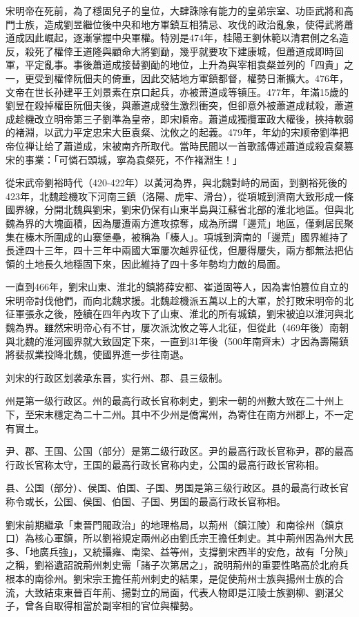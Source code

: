 宋明帝在死前，為了穩固兒子的皇位，大肆誅除有能力的皇弟宗室、功臣武將和高門士族，造成劉昱繼位後中央和地方軍鎮互相猜忌、攻伐的政治亂象，使得武將蕭道成因此崛起，逐漸掌握中央軍權。特別是474年，桂陽王劉休範以清君側之名造反，殺死了權倖王道隆與顧命大將劉勔，幾乎就要攻下建康城，但蕭道成即時回軍，平定亂事。事後蕭道成接替劉勔的地位，上升為與宰相袁粲並列的「四貴」之一，更受到權倖阮佃夫的倚重，因此交結地方軍鎮都督，權勢日漸擴大。476年，文帝在世长孙建平王刘景素在京口起兵，亦被萧道成等镇压。477年，年滿15歲的劉昱在殺掉權臣阮佃夫後，與蕭道成發生激烈衝突，但卻意外被蕭道成弒殺，蕭道成趁機改立明帝第三子劉準為皇帝，即宋順帝。蕭道成獨攬軍政大權後，挾持軟弱的褚淵，以武力平定忠宋大臣袁粲、沈攸之的起義。479年，年幼的宋顺帝劉準把帝位禅让给了蕭道成，宋被南齐所取代。當時民間以一首歌謠傳述蕭道成殺袁粲篡宋的事業：「可憐石頭城，寧為袁粲死，不作褚淵生！」

從宋武帝劉裕時代（420-422年）以黃河為界，與北魏對峙的局面，到劉裕死後的423年，北魏趁機攻下河南三鎮（洛陽、虎牢、滑台），從項城到濟南大致形成一條國界線，分開北魏與劉宋，劉宋仍保有山東半島與江蘇省北部的淮北地區。但與北魏為界的大塊面積，因為屢遭兩方進攻掠奪，成為所謂「邊荒」地區，僅剩居民聚集在榛木所圍成的山寨堡壘，被稱為「榛人」。項城到濟南的「邊荒」國界維持了長達四十三年，四十三年中兩國大軍屢次越界征伐，但屢得屢失，兩方都無法把佔領的土地長久地穩固下來，因此維持了四十多年勢均力敵的局面。

一直到466年，劉宋山東、淮北的鎮將薛安都、崔道固等人，因為害怕篡位自立的宋明帝討伐他們，而向北魏求援。北魏趁機派五萬以上的大軍，於打敗宋明帝的北征軍張永之後，陸續在四年內攻下了山東、淮北的所有城鎮，劉宋被迫以淮河與北魏為界。雖然宋明帝心有不甘，屢次派沈攸之等人北征，但從此（469年後）南朝與北魏的淮河國界就大致固定下來，一直到31年後（500年南齊末）才因為壽陽鎮將裴叔業投降北魏，使國界進一步往南退。

刘宋的行政区划袭承东晋，实行州、郡、县三级制。

州是第一级行政区。州的最高行政长官称刺史，劉宋一朝的州數大致在二十州上下，至宋末穩定為二十二州。其中不少州是僑寓州，為寄住在南方州郡上，不一定有實土。

尹、郡、王国、公国（部分）是第二级行政区。尹的最高行政长官称尹，郡的最高行政长官称太守，王国的最高行政长官称内史，公国的最高行政长官称相。

县、公国（部分）、侯国、伯国、子国、男国是第三级行政区。县的最高行政长官称令或长，公国、侯国、伯国、子国、男国的最高行政长官称相。

劉宋前期繼承「東晉門閥政治」的地理格局，以荊州（鎮江陵）和南徐州（鎮京口）為核心軍鎮，所以劉裕規定兩州必由劉氏宗王擔任刺史。其中荊州因為州大民多、「地廣兵強」，又統攝雍、南梁、益等州，支撐劉宋西半的安危，故有「分陝」之稱，劉裕遺詔說荊州刺史需「諸子次第居之」，說明荊州的重要性略高於北府兵根本的南徐州。劉宋宗王擔任荊州刺史的結果，是促使荊州士族與揚州士族的合流，大致結束東晉百年荊、揚對立的局面，代表人物即是江陵士族劉柳、劉湛父子，曾各自取得相當於副宰相的官位與權勢。

